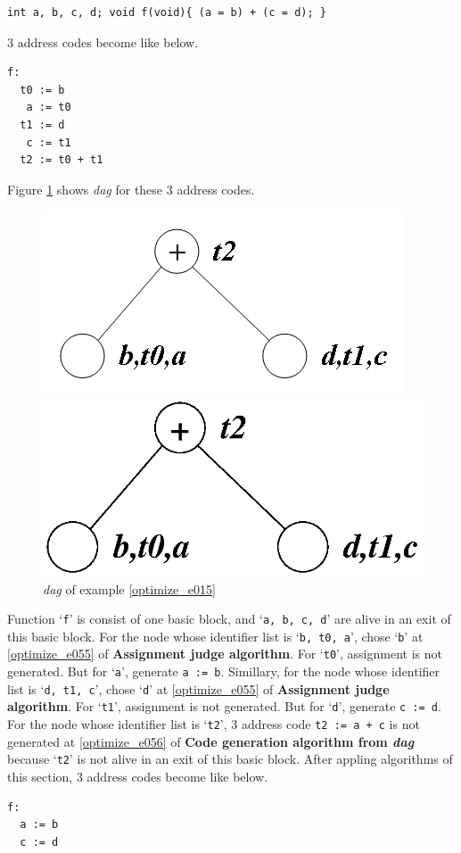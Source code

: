 \begin{Example}
\label{optimize_e015}
\begin{verbatim}
int a, b, c, d; void f(void){ (a = b) + (c = d); }
\end{verbatim}
3 address codes become like below.
\begin{verbatim}
f:
  t0 := b
   a := t0
  t1 := d
   c := t1
  t2 := t0 + t1
\end{verbatim}
Figure \ref{optimize_e016} shows {\em dag} for these 3 address codes.
\begin{figure}[htbp]
\begin{center}
\begin{htmlonly}
\includegraphics[width=0.7\linewidth,height=0.362\linewidth]{opt005.png}
\end{htmlonly}
\begin{latexonly}
\includegraphics[width=0.7\linewidth,height=0.362\linewidth]{opt005.eps}
\end{latexonly}
\caption{{\em dag} of example \ref{optimize_e015}}
\label{optimize_e016}
\end{center}
\end{figure}
Function `{\tt{f}}' is consist of one basic block, and 
`{\tt{a, b, c, d}}' are alive in an exit of this basic block.
For the node whose identifier list is `{\tt{b, t0, a}}',
chose `{\tt{b}}' at \ref{optimize_e055} of {\bf Assignment judge
 algorithm}. For `{\tt{t0}}', assignment is not generated.
But for `{\tt{a}}', generate {\tt{a := b}}.
Simillary, for the node whose identifier list is `{\tt{d, t1, c}}',
chose `{\tt{d}}' at \ref{optimize_e055} of {\bf Assignment judge
 algorithm}. For `{\tt{t1}}', assignment is not generated.
But for `{\tt{d}}', generate {\tt{c := d}}.
For the node whose identifier list is `{\tt{t2}}',
3 address code {\tt{t2 := a + c}} is not generated
at \ref{optimize_e056} of {\bf Code generation algorithm from {\em dag}}
because `{\tt{t2}}' is not alive in an exit of this basic block.
After appling algorithms of this section,
3 address codes become like below.
\begin{verbatim}
f:
  a := b
  c := d
\end{verbatim}
\end{Example}

